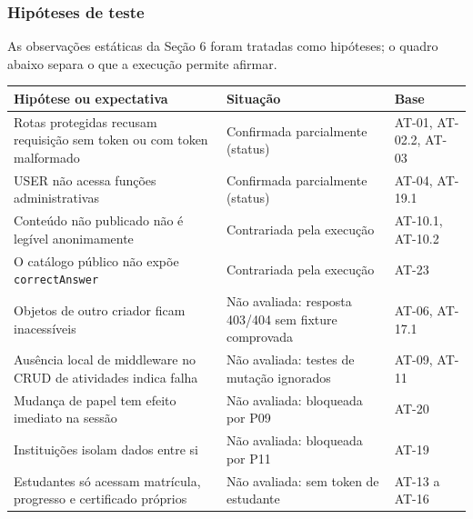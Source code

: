 \subsubsection{Hipóteses de teste}\label{hipuxf3teses-de-teste}

As observações estáticas da Seção 6 foram tratadas como hipóteses; o
quadro abaixo separa o que a execução permite afirmar.

{\def\LTcaptype{none} %
\begin{longtable}[]{@{}
  >{\raggedright\arraybackslash}p{}
  >{\raggedright\arraybackslash}p{}
  >{\raggedright\arraybackslash}p{}@{}}
\toprule\noalign{}
\begin{minipage}[b]{\linewidth}\raggedright
Hipótese ou expectativa
\end{minipage} & \begin{minipage}[b]{\linewidth}\raggedright
Situação
\end{minipage} & \begin{minipage}[b]{\linewidth}\raggedright
Base
\end{minipage} \\
\midrule\noalign{}
\endhead
\bottomrule\noalign{}
\endlastfoot
Rotas protegidas recusam requisição sem token ou com token malformado &
Confirmada parcialmente (status) & AT-01, AT-02.2, AT-03 \\
USER não acessa funções administrativas & Confirmada parcialmente
(status) & AT-04, AT-19.1 \\
Conteúdo não publicado não é legível anonimamente & Contrariada pela
execução & AT-10.1, AT-10.2 \\
O catálogo público não expõe \texttt{correctAnswer} & Contrariada pela
execução & AT-23 \\
Objetos de outro criador ficam inacessíveis & Não avaliada: resposta
403/404 sem fixture comprovada & AT-06, AT-17.1 \\
Ausência local de middleware no CRUD de atividades indica falha & Não
avaliada: testes de mutação ignorados & AT-09, AT-11 \\
Mudança de papel tem efeito imediato na sessão & Não avaliada: bloqueada
por P09 & AT-20 \\
Instituições isolam dados entre si & Não avaliada: bloqueada por P11 &
AT-19 \\
Estudantes só acessam matrícula, progresso e certificado próprios & Não
avaliada: sem token de estudante & AT-13 a AT-16 \\
\end{longtable}
}

